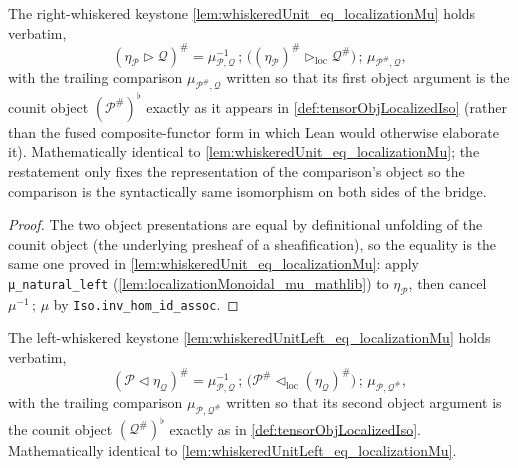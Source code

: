 \begin{lemma}
  \label{lem:whiskeredUnit_eq_localizationMu_canonical}
  The right-whiskered keystone \cref{lem:whiskeredUnit_eq_localizationMu} holds
  verbatim,
  \[
    (\eta_{\mathcal{P}} \rhd \mathcal{Q})^{\#}
      = \mu_{\mathcal{P},\mathcal{Q}}^{-1} \,;\,
        \bigl((\eta_{\mathcal{P}})^{\#} \rhd_{\mathrm{loc}} \mathcal{Q}^{\#}\bigr)
        \,;\, \mu_{\mathcal{P}^{\#},\mathcal{Q}},
  \]
  with the trailing comparison \(\mu_{\mathcal{P}^{\#},\mathcal{Q}}\) written so that
  its first object argument is the counit object
  \((\mathcal{P}^{\#})^{\flat}\) exactly as it appears in
  \cref{def:tensorObjLocalizedIso} (rather than the fused composite-functor form in
  which Lean would otherwise elaborate it). Mathematically identical to
  \cref{lem:whiskeredUnit_eq_localizationMu}; the restatement only fixes the
  representation of the comparison's object so the comparison is the syntactically
  same isomorphism on both sides of the bridge.
\end{lemma}

\begin{proof}
  The two object presentations are equal by definitional unfolding of the counit
  object (the underlying presheaf of a sheafification), so the equality is the same
  one proved in \cref{lem:whiskeredUnit_eq_localizationMu}: apply
  \texttt{μ\_natural\_left} (\cref{lem:localizationMonoidal_mu_mathlib}) to
  \(\eta_{\mathcal{P}}\), then cancel \(\mu^{-1}\,;\,\mu\) by
  \texttt{Iso.inv\_hom\_id\_assoc}.
\end{proof}

\begin{lemma}
  \label{lem:whiskeredUnitLeft_eq_localizationMu_canonical}
  The left-whiskered keystone \cref{lem:whiskeredUnitLeft_eq_localizationMu} holds
  verbatim,
  \[
    (\mathcal{P} \lhd \eta_{\mathcal{Q}})^{\#}
      = \mu_{\mathcal{P},\mathcal{Q}}^{-1} \,;\,
        \bigl(\mathcal{P}^{\#} \lhd_{\mathrm{loc}} (\eta_{\mathcal{Q}})^{\#}\bigr)
        \,;\, \mu_{\mathcal{P},\mathcal{Q}^{\#}},
  \]
  with the trailing comparison \(\mu_{\mathcal{P},\mathcal{Q}^{\#}}\) written so that
  its second object argument is the counit object \((\mathcal{Q}^{\#})^{\flat}\)
  exactly as in \cref{def:tensorObjLocalizedIso}. Mathematically identical to
  \cref{lem:whiskeredUnitLeft_eq_localizationMu}.
\end{lemma}

